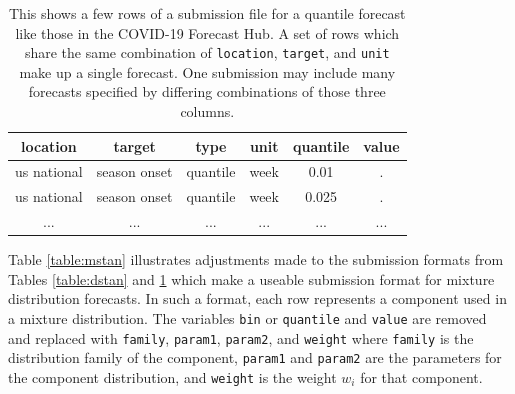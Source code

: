 \documentclass[11pt,notitlepage]{isuthesis}
\begin{document}
\begin{table}[h!]
\begin{center}
\begin{minipage}{11cm}
\captionsetup{font=scriptsize}
\centering
 \begin{tabular}{|c|c|c|c|c|c|}
 \hline
    location & target & type & unit & quantile & value  \\ \hline
    us national & season onset & quantile & week & 0.01 & . \\
    us national & season onset & quantile & week & 0.025 & . \\
    ... & ... & ... & ... & ... & ... \\
 \hline
 \end{tabular}
 \caption[COVID-19 Forecast Hub competition submission example]{This shows
 a few rows of a 
 submission file
 for a quantile forecast like those in the COVID-19 Forecast Hub. 
 A set of rows which share the same combination of 
 \texttt{location}, \texttt{target}, and \texttt{unit} make up a
 single forecast. One submission may include many forecasts specified by 
 differing combinations of those three columns.}
 \label{table:qstan}
 \end{minipage}
 \end{center}
\end{table}



Table \ref{table:mstan} illustrates adjustments made to the submission formats
from 
Tables \ref{table:dstan} and \ref{table:qstan} which make a useable submission 
format for mixture distribution forecasts. In such a format, each row represents
a component used in a mixture distribution.
The variables \texttt{bin} or \texttt{quantile} and \texttt{value} are removed 
and replaced with \texttt{family},
\texttt{param1}, \texttt{param2}, and \texttt{weight} where \texttt{family} is 
the distribution family of the component,
\texttt{param1} and \texttt{param2} are the parameters for the component 
distribution, and \texttt{weight} is the 
weight $w_i$ for that component.
\end{document}
